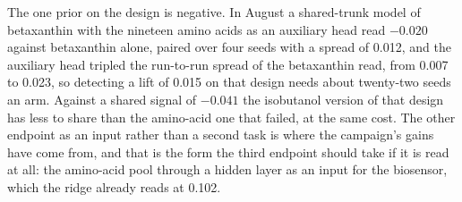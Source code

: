 

The one prior on the design is negative. In August a shared-trunk model of betaxanthin
with the nineteen amino acids as an auxiliary head read $-0.020$ against betaxanthin
alone, paired over four seeds with a spread of 0.012, and the auxiliary head tripled the
run-to-run spread of the betaxanthin read, from 0.007 to 0.023, so detecting a lift of
0.015 on that design needs about twenty-two seeds an arm. Against a shared signal of
$-0.041$ the isobutanol version of that design has less to share than the amino-acid one
that failed, at the same cost. The other endpoint as an input rather than a second
task is where the campaign's gains have come from, and that is the form the third
endpoint should take if it is read at all: the amino-acid pool through a hidden layer
as an input for the biosensor, which the ridge already reads at 0.102.
